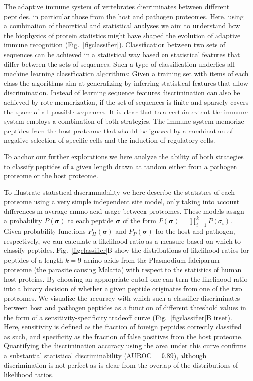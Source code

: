 \documentclass[superscriptaddress,twocolumn,pre]{revtex4}
\newcommand{\B}{\boldsymbol}
\newcommand{\<}{\langle}
\renewcommand{\>}{\rangle}
\begin{document}
The adaptive immune system of vertebrates discriminates between different peptides, in particular those from the host and pathogen proteomes. Here, using a combination of theoretical and statistical analyses we aim to understand how the biophysics of protein statistics might have shaped the evolution of adaptive immune recognition (Fig.~\ref{figclassifier}). Classification between two sets of sequences can be achieved in a statistical way based on statistical features that differ between the sets of sequences. Such a type of classification underlies all machine learning classification algorithms: Given a training set with items of each class the algorithms aim at generalizing by inferring statistical features that allow discrimination. Instead of learning sequence features discrimination can also be achieved by rote memorization, if the set of sequences is finite and sparsely covers the space of all possible sequences. It is clear that to a certain extent the immune system employs a combination of both strategies. The immune system memorize peptides from the host proteome that should be ignored by a combination of negative selection of specific cells and the induction of regulatory cells. 

To anchor our further explorations we here analyze the ability of both strategies to classify peptides of a given length drawn at random either from a pathogen proteome or the host proteome.

To illustrate statistical discriminability we here describe the statistics of each proteome using a very simple independent site model, only taking into account differences in average amino acid usage between proteomes. These models assign a probability $P(\B \sigma)$ to each peptide $\B \sigma$ of the form $P(\B \sigma) = \prod_{i=1}^k P(\sigma_i)$. Given probability functions $P_H(\B \sigma)$ and $P_P(\B \sigma)$ for the host and pathogen, respectively, we can calculate a likelihood ratio as a measure based on which to classify peptides. Fig.~\ref{figclassifier}B show the distributions of likelihood ratios for peptides of a length $k=9$ amino acids from the Plasmodium falciparum proteome (the parasite causing Malaria) with respect to the statistics of human host proteins. By choosing an appropriate cutoff one can turn the likelihood ratio into a binary decision of whether a given peptide originates from one of the two proteomes. We visualize the accuracy with which such a classifier discriminates between host and pathogen peptides as a function of different threshold values in the form of a sensitivity-specificity tradeoff curve (Fig.~\ref{figclassifier}B inset). Here, sensitivity is defined as the fraction of foreign peptides correctly classified as such, and specificity as the fraction of false positives from the host proteome. Quantifying the discrimination accuracy using the area under this curve confirms a substantial statistical discriminability (AUROC = 0.89), although discrimination is not perfect as is clear from the overlap of the distributions of likelihood ratios.
\end{document}
